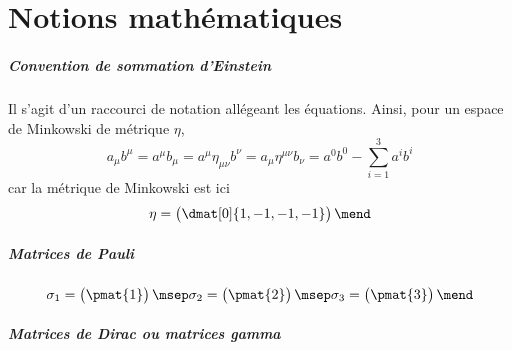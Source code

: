 \chapter{Notions mathématiques}\label{annexe-maths}

\paragraph{Convention de sommation d'Einstein}
Il s'agit d'un raccourci de notation allégeant les équations. Ainsi, pour un espace de Minkowski de métrique $\eta$,
\begin{equation}
a_\mu b^\mu
=a^\mu b_\mu
= a^\mu \eta_{\mu\nu} b^\nu
= a_\mu \eta^{\mu\nu} b_\nu
= a^0 b^0 - \sum_{i=1}^3 a^i b^i
\end{equation}
car la métrique de Minkowski est ici
\begin{equation}
\eta = \begin{pmatrix} \dmat[0]{1,-1,-1,-1} \end{pmatrix} \mend
\end{equation}

\paragraph{Matrices de Pauli}

\begin{equation}
\sigma_1 = \begin{pmatrix} \pmat{1} \end{pmatrix}
\msep
\sigma_2 = \begin{pmatrix} \pmat{2} \end{pmatrix}
\msep
\sigma_3 = \begin{pmatrix} \pmat{3} \end{pmatrix}
\mend
\end{equation}

\paragraph{Matrices de Dirac ou matrices gamma}

